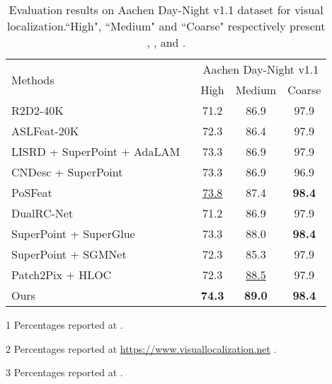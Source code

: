 \documentclass[journal]{IEEEtran}
\begin{document}
\begin{table}[h]
\centering
\renewcommand\arraystretch{1.5}
\caption{Evaluation results on Aachen Day-Night v1.1 dataset for visual localization.``High", ``Medium" and ``Coarse" respectively present , , and .}
\resizebox{.99\columnwidth}{!}
{
\begin{threeparttable}
\begin{tabular}{l|ccc}
    \hline
    \multirow{2}{*}{Methods} & \multicolumn{3}{c}{Aachen Day-Night v1.1} \\
    \cline{2-4}
            & High & Medium & Coarse \\
    \hline
    \hline
    R2D2-40K\tnote{1} \ \cite{R2D2}       & 71.2 & 86.9 & 97.9  \\
    ASLFeat-20K\tnote{2} \ \cite{aslfeat}    & 72.3 & 86.4 & 97.9 \\
    LISRD + SuperPoint + AdaLAM\tnote{1} \ \cite{LISRD} & 73.3 & 86.9 & 97.9 \\
    CNDesc + SuperPoint\tnote{3} \ \cite{cndesc} & 73.3 & 86.9 & 96.9 \\
    PoSFeat\tnote{1} \ \cite{li2022decoupling}            & \underline{73.8} & 87.4 & \textbf{98.4} \\
    
    \hline
    \hline
    DualRC-Net\tnote{1} \ \cite{DualRC-Net}             & 71.2 & 86.9 & 97.9 \\
    SuperPoint + SuperGlue\tnote{1} \ \cite{SuperGlue} & 73.3 & 88.0 & \textbf{98.4} \\
    SuperPoint + SGMNet\tnote{1} \ \cite{sgmnet}    & 72.3 & 85.3 & 97.9 \\
    Patch2Pix \cite{Patch2Pix} + HLOC\tnote{2} \ \cite{HLOC}                    & 72.3 & \underline{88.5} & 97.9 \\
    \hline
    \hline
    Ours  & \textbf{74.3} & \textbf{89.0} & \textbf{98.4} \\
    \hline
\end{tabular}
\begin{tablenotes}
\footnotesize
\item[1] Percentages reported at \cite{li2022decoupling}.
\item[2] Percentages reported at \href{https://www.visuallocalization.net/benchmark/}{https://www.visuallocalization.net} \cite{aachen}.
\item[3] Percentages reported at \cite{cndesc}.
\end{tablenotes}
\end{threeparttable}
}
\label{table2}
\end{table}
\end{document}
